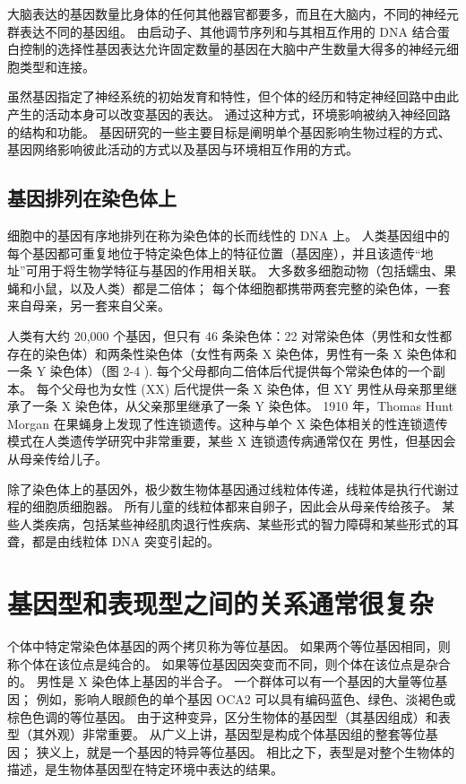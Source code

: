 大脑表达的基因数量比身体的任何其他器官都要多，而且在大脑内，不同的神经元群表达不同的基因组。 由启动子、其他调节序列和与其相互作用的 DNA 结合蛋白控制的选择性基因表达允许固定数量的基因在大脑中产生数量大得多的神经元细胞类型和连接。

虽然基因指定了神经系统的初始发育和特性，但个体的经历和特定神经回路中由此产生的活动本身可以改变基因的表达。 通过这种方式，环境影响被纳入神经回路的结构和功能。 基因研究的一些主要目标是阐明单个基因影响生物过程的方式、基因网络影响彼此活动的方式以及基因与环境相互作用的方式。



\subsection{基因排列在染色体上}

细胞中的基因有序地排列在称为染色体的长而线性的 DNA 上。 人类基因组中的每个基因都可重复地位于特定染色体上的特征位置（基因座），并且该遗传“地址”可用于将生物学特征与基因的作用相关联。 大多数多细胞动物（包括蠕虫、果蝇和小鼠，以及人类）都是二倍体； 每个体细胞都携带两套完整的染色体，一套来自母亲，另一套来自父亲。

人类有大约 20,000 个基因，但只有 46 条染色体：22 对常染色体（男性和女性都存在的染色体）和两条性染色体（女性有两条 X 染色体，男性有一条 X 染色体和一条 Y 染色体）（图 2-4 ). 每个父母都向二倍体后代提供每个常染色体的一个副本。 每个父母也为女性 (XX) 后代提供一条 X 染色体，但 XY 男性从母亲那里继承了一条 X 染色体，从父亲那里继承了一条 Y 染色体。 1910 年，Thomas Hunt Morgan 在果蝇身上发现了性连锁遗传。这种与单个 X 染色体相关的性连锁遗传模式在人类遗传学研究中非常重要，某些 X 连锁遗传病通常仅在 男性，但基因会从母亲传给儿子。

除了染色体上的基因外，极少数生物体基因通过线粒体传递，线粒体是执行代谢过程的细胞质细胞器。 所有儿童的线粒体都来自卵子，因此会从母亲传给孩子。 某些人类疾病，包括某些神经肌肉退行性疾病、某些形式的智力障碍和某些形式的耳聋，都是由线粒体 DNA 突变引起的。

\section{基因型和表现型之间的关系通常很复杂}

个体中特定常染色体基因的两个拷贝称为等位基因。 如果两个等位基因相同，则称个体在该位点是纯合的。 如果等位基因因突变而不同，则个体在该位点是杂合的。 男性是 X 染色体上基因的半合子。 一个群体可以有一个基因的大量等位基因； 例如，影响人眼颜色的单个基因 OCA2 可以具有编码蓝色、绿色、淡褐色或棕色色调的等位基因。 由于这种变异，区分生物体的基因型（其基因组成）和表型（其外观）非常重要。 从广义上讲，基因型是构成个体基因组的整套等位基因； 狭义上，就是一个基因的特异等位基因。 相比之下，表型是对整个生物体的描述，是生物体基因型在特定环境中表达的结果。

